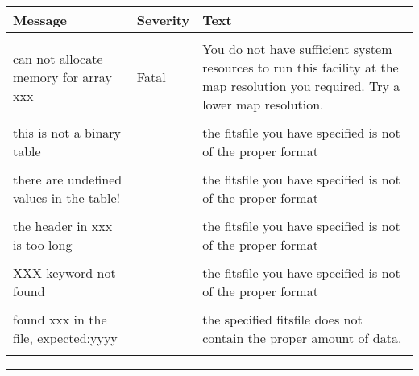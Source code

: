 \begin{messages}
{
\begin{tabular}{p{0.25\hsize} p{0.1\hsize} p{0.35\hsize}} \hline  
  \textbf{Message} & \textbf{Severity} & \textbf{Text} \\ \hline
                   &                   &   \\ %
can not allocate memory for array xxx &  Fatal & You do not have
                   sufficient system resources to run this
                   facility at the map resolution you required. 
  Try a lower map resolution.  \\ 
                   &                   &   \\ \hline %

this is not a binary table & & the fitsfile you have specified is not 
of the proper format \\
                   &                   &   \\ \hline %
there are undefined values in the table! & & the fitsfile you have specified is not 
of the proper format \\
                  &                   &   \\ \hline %
the header in xxx is too long & & the fitsfile you have specified is not 
of the proper format \\
                  &                   &   \\ \hline %
XXX-keyword not found & & the fitsfile you have specified is not 
of the proper format \\
                  &                   &   \\ \hline %
found xxx in the file, expected:yyyy & & the specified fitsfile does not
contain the proper amount of data. \\
                   &                   &   \\ \hline %



\end{tabular}
} 
\end{messages}

\rule{\hsize}{2mm}

\newpage
